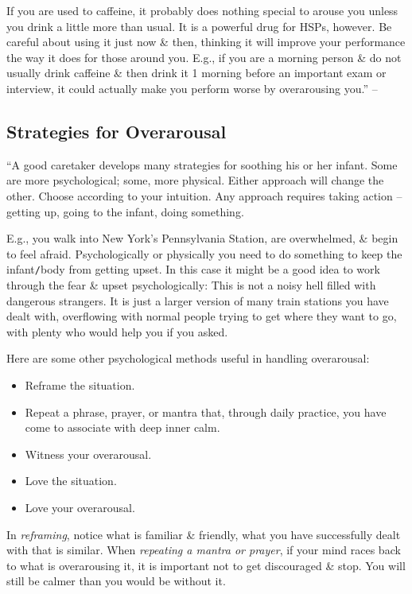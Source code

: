 \documentclass{article}
\numberwithin{equation}{section}
\begin{document}
If you are used to caffeine, it probably does nothing special to arouse you unless you drink a little more than usual. It is a powerful drug for HSPs, however. Be careful about using it just now \& then, thinking it will improve your performance the way it does for those around you. E.g., if you are a morning person \& do not usually drink caffeine \& then drink it 1 morning before an important exam or interview, it could actually make you perform worse by overarousing you.'' -- \cite[pp. 88--90]{Aron2013}

\subsection{Strategies for Overarousal}
``A good caretaker develops many strategies for soothing his or her infant. Some are more psychological; some, more physical. Either approach will change the other. Choose according to your intuition. Any approach requires taking action -- getting up, going to the infant, doing something.

E.g., you walk into New York's Pennsylvania Station, are overwhelmed, \& begin to feel afraid. Psychologically or physically you need to do something to keep the infant{\tt/}body from getting upset. In this case it might be a good idea to work through the fear \& upset psychologically: This is not a noisy hell filled with dangerous strangers. It is just a larger version of many train stations you have dealt with, overflowing with normal people trying to get where they want to go, with plenty who would help you if you asked.

Here are some other psychological methods useful in handling overarousal:
\begin{itemize}
	\item Reframe the situation.
	\item Repeat a phrase, prayer, or mantra that, through daily practice, you have come to associate with deep inner calm.
	\item Witness your overarousal.
	\item Love the situation.
	\item Love your overarousal.
\end{itemize}
In \textit{reframing}, notice what is familiar \& friendly, what you have successfully dealt with that is similar. When \textit{repeating a mantra or prayer}, if your mind races back to what is overarousing it, it is important not to get discouraged \& stop. You will still be calmer than you would be without it.
\end{document}
